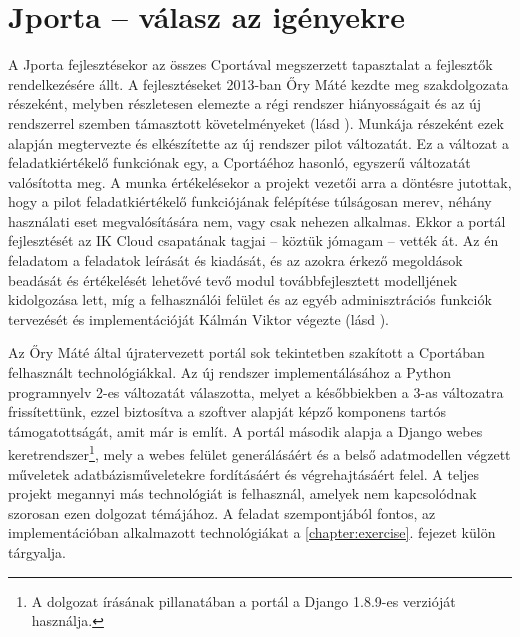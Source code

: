 \section{Jporta -- válasz az igényekre}
A Jporta fejlesztésekor az összes Cportával megszerzett tapasztalat a fejlesztők rendelkezésére állt.
A fejlesztéseket 2013-ban Őry Máté kezdte meg szakdolgozata részeként, melyben részletesen elemezte a régi rendszer hiányosságait és az új rendszerrel szemben támasztott követelményeket (lásd \cite{Ory13}).
Munkája részeként ezek alapján megtervezte és elkészítette az új rendszer pilot változatát.  
Ez a változat a feladatkiértékelő funkciónak egy, a Cportáéhoz hasonló, egyszerű változatát valósította meg.
A munka értékelésekor a projekt vezetői arra a döntésre jutottak, hogy a pilot feladatkiértékelő funkciójának felépítése túlságosan merev, néhány használati eset megvalósítására nem, vagy csak nehezen alkalmas. 
Ekkor a portál fejlesztését az IK Cloud csapatának tagjai -- köztük jómagam -- vették át.
Az én feladatom a feladatok leírását és kiadását, és az azokra érkező megoldások beadását és értékelését lehetővé tevő modul továbbfejlesztett modelljének kidolgozása lett, míg a felhasználói felület és az egyéb adminisztrációs funkciók tervezését és implementációját Kálmán Viktor végezte (lásd \cite{Kalman14}).

Az Őry Máté által újratervezett portál sok tekintetben szakított a Cportában felhasznált technológiákkal.
Az új rendszer implementálásához a Python programnyelv 2-es változatát válaszotta, melyet a későbbiekben a 3-as változatra frissítettünk, ezzel biztosítva a szoftver alapját képző komponens tartós támogatottságát, amit már \cite{Kalman14} is említ.
A portál második alapja a Django webes keretrendszer\footnote{A dolgozat írásának pillanatában a portál a Django 1.8.9-es verzióját használja.}, mely a webes felület generálásáért és a belső adatmodellen végzett műveletek adatbázisműveletekre fordításáért és végrehajtásáért felel. 
A teljes projekt megannyi más technológiát is felhasznál, amelyek nem kapcsolódnak szorosan ezen dolgozat témájához.
A feladat szempontjából fontos, az implementációban alkalmazott technológiákat a \ref{chapter:exercise}. fejezet külön tárgyalja.

